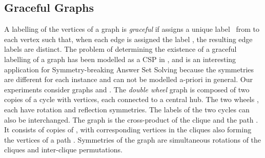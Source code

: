\documentclass[envcountsame]{llncs}
\begin{document}
\subsection{Graceful Graphs}
A labelling  of the vertices of a graph  is \emph{graceful} if  assigns a unique label~ from  to each vertex  such that, when each edge  is assigned the label , the resulting edge labels are distinct. The problem of determining the existence of a graceful labelling of a graph has been modelled as a CSP in \cite{pesm03a}, and is an interesting application for Symmetry-breaking Answer Set Solving because the symmetries are different for each instance and can not be modelled a-priori in general. Our experiments consider graphs  and . The \emph{double wheel} graph  is composed of two copies of a cycle with  vertices, each connected to a central hub. The two wheels , each have rotation and reflection symmetries. The labels of the two cycles can also be interchanged. The graph  is the cross-product of the clique  and the path . It consists of  copies of , with corresponding vertices in the  cliques also forming the vertices of a path . Symmetries of the graph are simultaneous rotations of the cliques and inter-clique permutations.
\end{document}
